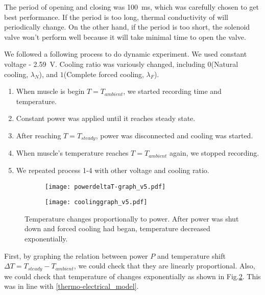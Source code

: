 The period of opening and closing was \SI{100}{\milli\second}, which was carefully chosen to get best performance. If the period is too long, thermal conductivity of \scp will periodically change. On the other hand, if the period is too short, the solenoid valve won't perform well because it will take minimal time to open the valve. 

We followed a following process to do dynamic experiment. We used constant voltage - \SI{2.59}{\volt}. Cooling ratio was variously changed, including $0$(Natural cooling, $\lambda_{N}$), and $1$(Complete forced cooling, $\lambda_{F}$). 
\begin{enumerate}
\item When muscle is begin $T=T_{ambient}$, we started recording time and temperature.
\item Constant power was applied until it reaches steady state.
\item After reaching $T=T_{steady}$, power was disconnected and cooling was started. 
\item When muscle's temperature reaches $T=T_{ambient}$ again, we stopped recording. 
\item We repeated process 1-4 with other voltage and cooling ratio.
\end{enumerate}


\begin{figure}[t]
	\centering
	\begin{subfigure}[t]{0.45\linewidth}
		\centering\texttt{[image: powerdeltaT-graph\_v5.pdf]}
		\caption{\label{powerdeltaT}}
	\end{subfigure}%
	\begin{subfigure}[t]{0.45\linewidth}
		\centering\texttt{[image: coolinggraph\_v5.pdf]}
		\caption{\label{coolinggraph}}
	\end{subfigure}
	\caption[Results of dynamic experiment]{ Temperature changes proportionally to power.  After power was shut down and forced cooling had began, temperature decreased exponentially.}
	\label{result_dynamic}
\end{figure}

First, by graphing the relation between power $P$ and temperature shift $\Delta{T}=T_{steady}-T_{ambient}$, we could check that they are linearly proportional.
Also, we could check that temperature of \scp changes exponentially as shown in Fig.\ref{coolinggraph}. This was in line with  \eqref{thermo-electrical_model}.

